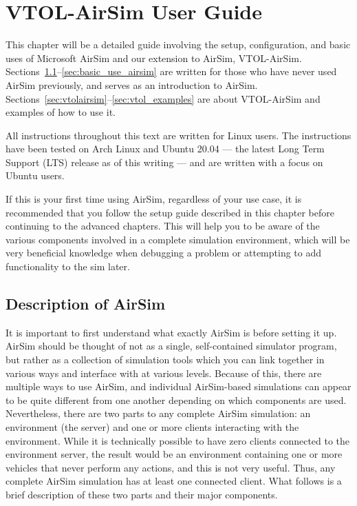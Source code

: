
\chapter{VTOL-AirSim User Guide}\label{chp:userguide}

This chapter will be a detailed guide involving the setup, configuration, and basic uses of Microsoft AirSim and our extension to AirSim, VTOL-AirSim. Sections~\ref{sec:description_airsim}--\ref{sec:basic_use_airsim} are written for those who have never used AirSim previously, and serves as an introduction to AirSim. Sections~\ref{sec:vtolairsim}--\ref{sec:vtol_examples} are about VTOL-AirSim and examples of how to use it.

All instructions throughout this text are written for Linux users. The instructions have been tested on Arch Linux and Ubuntu 20.04 --- the latest Long Term Support (LTS) release as of this writing --- and are written with a focus on Ubuntu users.

If this is your first time using AirSim, regardless of your use case, it is recommended that you follow the setup guide described in this chapter before continuing to the advanced chapters. This will help you to be aware of the various components involved in a complete simulation environment, which will be very beneficial knowledge when debugging a problem or attempting to add functionality to the sim later.

\section{Description of AirSim}\label{sec:description_airsim}

It is important to first understand what exactly AirSim is before setting it up. AirSim should be thought of not as a single, self-contained simulator program, but rather as a collection of simulation tools which you can link together in various ways and interface with at various levels. Because of this, there are multiple ways to use AirSim, and individual AirSim-based simulations can appear to be quite different from one another depending on which components are used. Nevertheless, there are two parts to any complete AirSim simulation: an environment (the server) and one or more clients interacting with the environment. While it is technically possible to have zero clients connected to the environment server, the result would be an environment containing one or more vehicles that never perform any actions, and this is not very useful. Thus, any complete AirSim simulation has at least one connected client. What follows is a brief description of these two parts and their major components.

